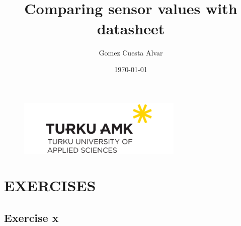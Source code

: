 \documentclass[14pt]{article}
\title{\textbf{\huge{\titulo}}\\
	{Comparing sensor values with datasheet}}
\author{Gomez Cuesta Alvar}
\date{\today}
\begin{document}
	\selectfont
	\begin{figure}
		\centering
		\includegraphics[width=0.7\textwidth]{./images/turunamk_logo.png}
	\end{figure}
	\maketitle
	
	\newpage
	
	\section*{EXERCISES}
		\subsection*{Exercise x}
		
\end{document}
